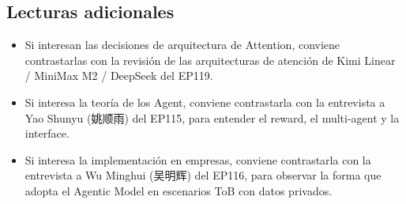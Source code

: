 \documentclass[a4paper]{article}
\begin{document}
\subsection{Lecturas adicionales}

\begin{itemize}
\item Si interesan las decisiones de arquitectura de Attention, conviene contrastarlas con la revisión de las arquitecturas de atención de Kimi Linear / MiniMax M2 / DeepSeek del EP119.
\item Si interesa la teoría de los Agent, conviene contrastarla con la entrevista a Yao Shunyu (姚顺雨) del EP115, para entender el reward, el multi-agent y la interface.
\item Si interesa la implementación en empresas, conviene contrastarla con la entrevista a Wu Minghui (吴明辉) del EP116, para observar la forma que adopta el Agentic Model en escenarios ToB con datos privados.
\end{itemize}
\end{document}
